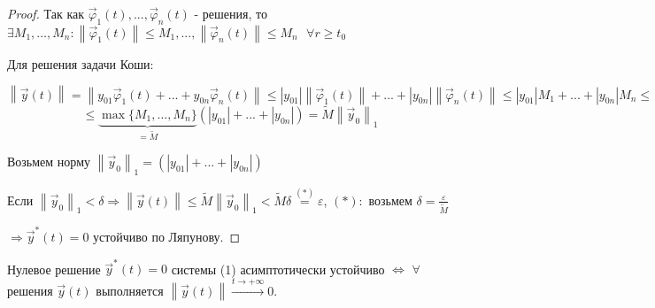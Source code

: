 \documentclass[12pt, a4paper]{report}
\begin{document}
\begin{proof}
    Так как \( \vec{\varphi }_1 (t ),..., \vec{\varphi }_n (t)   \) - решения, то \( \exists  M_1, \ldots, M_n : \left\lVert \vec{\varphi}_1  (t ) \right\rVert \le  M_1 ,..., \left\lVert  \vec{\varphi }_n (t) \right\rVert \le M_n \text{ }  \forall  r \ge  t_0 \) 

    Для решения задачи Коши: 

    \[ \left\lVert \vec{y } (t) \right\rVert  = \left\lVert y_{01} \vec{\varphi }_1 (t ) +...+ y_{0n } \vec{\varphi }_n(t)   \right\rVert \le \left\lvert y_{01} \right\rvert \left\lVert \vec{\varphi}_1 (t )  \right\rVert +...+ \left\lvert y_{0n }  \right\rvert \left\lVert  \vec{\varphi} _n (t) \right\rVert \le  \left\lvert y_{01} \right\rvert M_1+ ... + \left\lvert y_{0n}   \right\rvert M_n \le  \] 
    \[ \le  \underbrace{\max  \{M_1, \ldots, M_n\}}_{= \tilde{M}} (\left\lvert y_{01} \right\rvert + ...+ \left\lvert  y_{0n}  \right\rvert) = \tilde{M } \left\lVert \vec{y } _0 \right\rVert _1 \] 

    Возьмем норму \( \left\lVert \vec{y } _0 \right\rVert _1 = (\left\lvert y_{01} \right\rvert + ...+ \left\lvert y_{0n}  \right\rvert) \) 

    Если \( \left\lVert  \vec{y } _0  \right\rVert _ 1 < \delta \Rightarrow \left\lVert \vec{y } (t) \right\rVert  \le  \tilde{M } \left\lVert \vec{y} _0 \right\rVert _1  < \tilde{M }\delta \overset{(*)}{= }\varepsilon \), \( (*): \)  возьмем \( \delta =\displaystyle  \frac{\varepsilon}{\tilde{ M}}  \) 

    \( \Rightarrow  \vec{y } ^* (t) = 0\)  устойчиво по Ляпунову. 

\end{proof}

\begin{theorem}
    Нулевое решение \( \vec{y } ^{* } (t) = 0 \) системы (1) асимптотически устойчиво \( \Leftrightarrow  \) \( \forall  \) решения \( \vec{y } (t) \) выполняется \( \left\lVert \vec{y } (t) \right\rVert \xrightarrow{t \to  +\infty  } 0   \).
\end{theorem}
\end{document}
